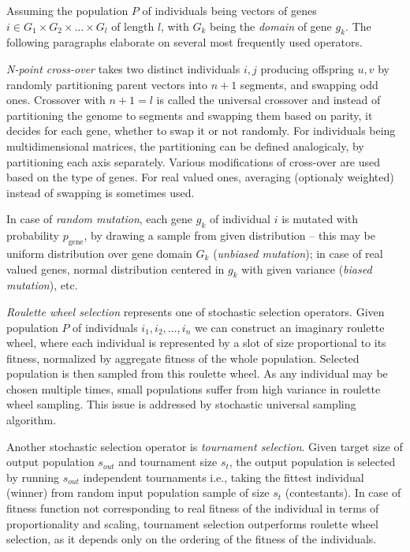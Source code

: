 Assuming the population $P$ of individuals being vectors of genes $i \in G_1 \times G_2 \times \dots \times G_l$ of length $l$, with $G_k$ being the \emph{domain} of gene $g_k$. The following paragraphs elaborate on several most frequently used operators.

\emph{N-point cross-over} takes two distinct individuals $i, j$ producing offspring $u, v$ by randomly partitioning parent vectors into $n+1$ segments, and swapping odd ones. Crossover with $n + 1 = l$ is called the universal crossover and instead of partitioning the genome to segments and swapping them based on parity, it decides for each gene, whether to swap it or not randomly. For individuals being multidimensional matrices, the partitioning can be defined analogicaly, by partitioning each axis separately. Various modifications of cross-over are used based on the type of genes. For real valued ones, averaging (optionaly weighted) instead of swapping is sometimes used.

In case of \emph{random mutation}, each gene $g_k$ of individual $i$ is mutated with probability $p_{\text{gene}}$, by drawing a sample from given distribution -- this may be uniform distribution over gene domain $G_k$ (\emph{unbiased mutation}); in case of real valued genes, normal distribution centered in $g_k$ with given variance (\emph{biased mutation}), etc.

\emph{Roulette wheel selection} represents one of stochastic selection operators. Given population $P$ of individuals $i_1, i_2, \dots, i_n$ we can construct an imaginary roulette wheel, where each individual is represented by a slot of size proportional to its fitness, normalized by aggregate fitness of the whole population. Selected population is then sampled from this roulette wheel. As any individual may be chosen multiple times, small populations suffer from high variance in roulette wheel sampling. This issue is addressed by stochastic universal sampling algorithm.

Another stochastic selection operator is \emph{tournament selection}. Given target size of output population $s_{out}$ and tournament size $s_t$, the output population is selected by running $s_{out}$ independent tournaments i.e., taking the fittest individual (winner) from random input population sample of size $s_t$ (contestants). In case of fitness function not corresponding to real fitness of the individual in terms of proportionality and scaling, tournament selection outperforms roulette wheel selection, as it depends only on the ordering of the fitness of the individuals.
